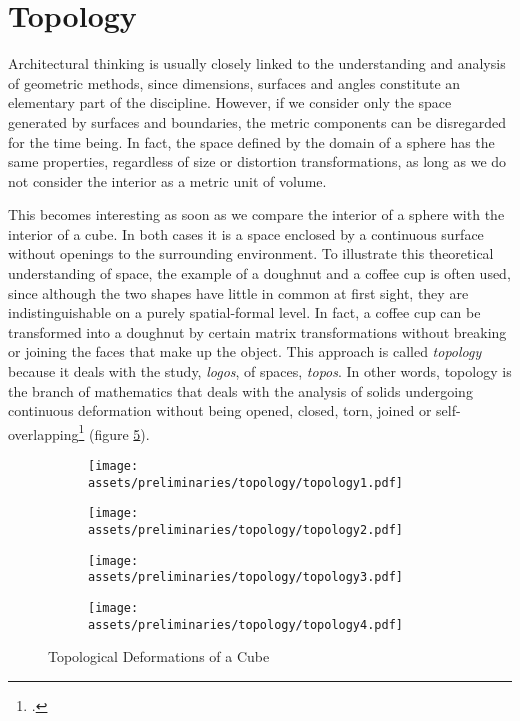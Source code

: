 \documentclass[a4paper, 12pt]{report}
\begin{document}
\section{Topology}\label{sec:topology}

Architectural thinking is usually closely linked to the understanding and analysis of geometric methods, since dimensions, surfaces and angles constitute an elementary part of the discipline. However, if we consider only the space generated by surfaces and boundaries, the metric components can be disregarded for the time being. In fact, the space defined by the domain of a sphere has the same properties, regardless of size or distortion transformations, as long as we do not consider the interior as a metric unit of volume.

This becomes interesting as soon as we compare the interior of a sphere with the interior of a cube. In both cases it is a space enclosed by a continuous surface without openings to the surrounding environment. To illustrate this theoretical understanding of space, the example of a doughnut and a coffee cup is often used, since although the two shapes have little in common at first sight, they are indistinguishable on a purely spatial-formal level. In fact, a coffee cup can be transformed into a doughnut by certain matrix transformations without breaking or joining the faces that make up the object. This approach is called \textit{topology} because it deals with the study, \textit{logos}, of spaces, \textit{topos}. In other words, topology is the branch of mathematics that deals with the analysis of solids undergoing continuous deformation without being opened, closed, torn, joined or self-overlapping\footcite{kantor2005tale} (figure \ref{fig:topological-deformation-of-a-cube}).

\begin{figure}
\centering
\begin{subfigure}{.25\textwidth}
\centering
\texttt{[image: assets/preliminaries/topology/topology1.pdf]}
\label{fig:topological-shape-i}
\end{subfigure}%
\begin{subfigure}{.25\textwidth}
\centering
\texttt{[image: assets/preliminaries/topology/topology2.pdf]}
\label{fig:topological-shape-ii}
\end{subfigure}%
\begin{subfigure}{.25\textwidth}
\centering
\texttt{[image: assets/preliminaries/topology/topology3.pdf]}
\label{fig:topological-shape-iii}
\end{subfigure}%
\begin{subfigure}{.25\textwidth}
\centering
\texttt{[image: assets/preliminaries/topology/topology4.pdf]}
\label{fig:topological-shape-iv}
\end{subfigure}
\caption{Topological Deformations of a Cube}
\label{fig:topological-deformation-of-a-cube}
\end{figure}
\end{document}
